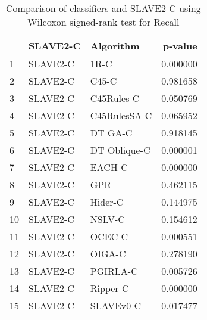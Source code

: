 \begin{table}
\footnotesize
\caption{Comparison of classifiers and SLAVE2-C using Wilcoxon signed-rank test for Recall}
\label{tab:SLAVE2-C wilcoxon Recall comparison}
\begin{tabular}{lllr}
\hline
 & SLAVE2-C & Algorithm & p-value \\
\hline
1 & SLAVE2-C & 1R-C & 0.000000 \\
2 & SLAVE2-C & C45-C & 0.981658 \\
3 & SLAVE2-C & C45Rules-C & 0.050769 \\
4 & SLAVE2-C & C45RulesSA-C & 0.065952 \\
5 & SLAVE2-C & DT GA-C & 0.918145 \\
6 & SLAVE2-C & DT Oblique-C & 0.000001 \\
7 & SLAVE2-C & EACH-C & 0.000000 \\
8 & SLAVE2-C & GPR & 0.462115 \\
9 & SLAVE2-C & Hider-C & 0.144975 \\
10 & SLAVE2-C & NSLV-C & 0.154612 \\
11 & SLAVE2-C & OCEC-C & 0.000551 \\
12 & SLAVE2-C & OIGA-C & 0.278190 \\
13 & SLAVE2-C & PGIRLA-C & 0.005726 \\
14 & SLAVE2-C & Ripper-C & 0.000000 \\
15 & SLAVE2-C & SLAVEv0-C & 0.017477 \\
\hline
\end{tabular}
\end{table}
